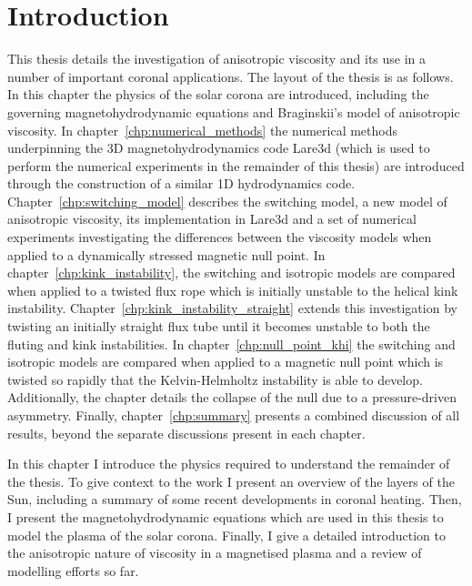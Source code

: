 \chapter{Introduction}
\label{chp:background}

\graphicspath{{images/background/}}

This thesis details the investigation of anisotropic viscosity and its use in a number of important coronal applications. The layout of the thesis is as follows. In this chapter the physics of the solar corona are introduced, including the governing magnetohydrodynamic equations and Braginskii's model of anisotropic viscosity. In chapter~\ref{chp:numerical_methods} the numerical methods underpinning the 3D magnetohydrodynamics code Lare3d (which is used to perform the numerical experiments in the remainder of this thesis) are introduced through the construction of a similar 1D hydrodynamics code. Chapter~\ref{chp:switching_model} describes the switching model, a new model of anisotropic viscosity, its implementation in Lare3d and a set of numerical experiments investigating the differences between the viscosity models when applied to a dynamically stressed magnetic null point. In chapter~\ref{chp:kink_instability}, the switching and isotropic models are compared when applied to a twisted flux rope which is initially unstable to the helical kink instability. Chapter~\ref{chp:kink_instability_straight} extends this investigation by twisting an initially straight flux tube until it becomes unstable to both the fluting and kink instabilities. In chapter~\ref{chp:null_point_khi} the switching and isotropic models are compared when applied to a magnetic null point which is twisted so rapidly that the Kelvin-Helmholtz instability is able to develop. Additionally, the chapter details the collapse of the null due to a pressure-driven asymmetry. Finally, chapter~\ref{chp:summary} presents a combined discussion of all results, beyond the separate discussions present in each chapter.

In this chapter I introduce the physics required to understand the remainder of the thesis. To give context to the work I present an overview of the layers of the Sun, including a summary of some recent developments in coronal heating. Then, I present the magnetohydrodynamic equations which are used in this thesis to model the plasma of the solar corona. Finally, I give a detailed introduction to the anisotropic nature of viscosity in a magnetised plasma and a review of modelling efforts so far.

